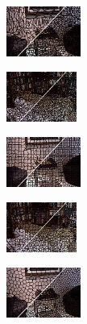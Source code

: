 \begin{figure}
\begin{subfigure}[b]{0.02\textwidth}
    \end{subfigure}
    \begin{subfigure}[b]{0.1375\textwidth}
        \includegraphics[height=1.65cm]{pictures/nyuv2/ers/cropped/ers_00001297_contours}
    \end{subfigure}
    \begin{subfigure}[b]{0.129\textwidth}
        \includegraphics[height=1.65cm]{pictures/sunrgbd/ers/cropped/ers_00007477_contours}
    \end{subfigure}
    \begin{subfigure}[b]{0.02\textwidth}
    \end{subfigure}
    \begin{subfigure}[b]{0.1375\textwidth}
        \includegraphics[height=1.65cm]{pictures/nyuv2/pb/cropped/pb_00001297_contours}
    \end{subfigure}
    \begin{subfigure}[b]{0.129\textwidth}
        \includegraphics[height=1.65cm]{pictures/sunrgbd/pb/cropped/pb_00007477_contours}
    \end{subfigure}
    \begin{subfigure}[b]{0.02\textwidth}
    \end{subfigure}
    \begin{subfigure}[b]{0.1375\textwidth}
        \includegraphics[height=1.65cm]{pictures/nyuv2/dasp/cropped/dasp_00001297_contours}

\end{subfigure}
\end{figure}
